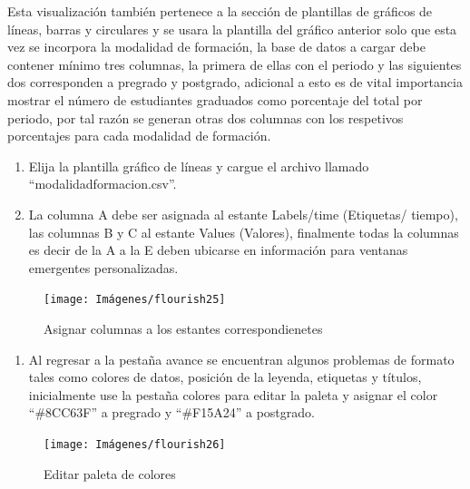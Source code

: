 \documentclass[
]{book}
\providecommand{\tightlist}{%
  \setlength{\itemsep}{0pt}\setlength{\parskip}{0pt}}
\begin{document}
Esta visualización también pertenece a la sección de plantillas de gráficos de líneas, barras y circulares y se usara la plantilla del gráfico anterior solo que esta vez se incorpora la modalidad de formación, la base de datos a cargar debe contener mínimo tres columnas, la primera de ellas con el periodo y las siguientes dos corresponden a pregrado y postgrado, adicional a esto es de vital importancia mostrar el número de estudiantes graduados como porcentaje del total por periodo, por tal razón se generan otras dos columnas con los respetivos porcentajes para cada modalidad de formación.

\begin{enumerate}
\def\labelenumi{\arabic{enumi}.}
\item
  Elija la plantilla gráfico de líneas y cargue el archivo llamado ``modalidadformacion.csv''.
\item
  La columna A debe ser asignada al estante Labels/time (Etiquetas/ tiempo), las columnas B y C al estante Values (Valores), finalmente todas la columnas es decir de la A a la E deben ubicarse en información para ventanas emergentes personalizadas.
\end{enumerate}

\begin{figure}

{\centering \texttt{[image: Imágenes/flourish25]} 

}

\caption{Asignar columnas a los estantes correspondienetes}\label{fig:asignaciondecamposflourish-fig}
\end{figure}

\begin{enumerate}
\def\labelenumi{\arabic{enumi}.}
\setcounter{enumi}{2}
\tightlist
\item
  Al regresar a la pestaña avance se encuentran algunos problemas de formato tales como colores de datos, posición de la leyenda, etiquetas y títulos, inicialmente use la pestaña colores para editar la paleta y asignar el color ``\#8CC63F'' a pregrado y ``\#F15A24'' a postgrado.
\end{enumerate}

\begin{figure}

{\centering \texttt{[image: Imágenes/flourish26]} 

}

\caption{Editar paleta de colores}\label{fig:editarcoloresflourish-fig}
\end{figure}
\end{document}
